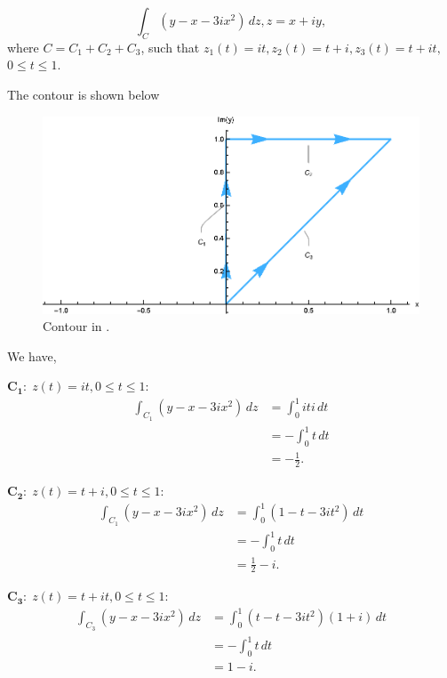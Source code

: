 \documentclass[12pt]{book}
\begin{document}
\begin{exmp}
    \[
        \int_{C} (y - x - 3ix^2)\,dz, z = x + iy,
    \]
where $C = C_1 + C_2 + C_3$, such that $z_{1}(t) = it, z_{2}(t) = t + i, z_{3}(t) = t + it,$ $0 \leq t \leq 1.$
\end{exmp}
The contour is shown below
\begin{figure}[H]
    \centering
    \includegraphics[scale = 0.7]{./figs/chapter_2/ci_contour_ex_1.eps}
    \caption{Contour in .}
\end{figure}

We have,

\noindent $\mathbf{C_1}:\; z(t) = it, 0 \leq t \leq 1:$ \\
\begin{align*}
    \int_{C_1} (y - x - 3ix^2)\,dz
        &=
            \int_{0}^{1} it i\,dt \\
        &=
            -\int_{0}^{1} t\,dt \\
        &=
            -\frac{1}{2}.
\end{align*}

\noindent $\mathbf{C_2}:\; z(t) = t + i, 0 \leq t \leq 1:$ \\
\begin{align*}
    \int_{C_1} (y - x - 3ix^2)\,dz
        &=
            \int_{0}^{1}  (1 - t - 3it^2)\,dt \\
        &=
            -\int_{0}^{1} t\,dt \\
        &=
            \frac{1}{2} - i.
\end{align*}

\noindent $\mathbf{C_3}:\; z(t) = t + it, 0 \leq t \leq 1:$ \\
\begin{align*}
    \int_{C_3} (y - x - 3ix^2)\,dz
        &=
            \int_{0}^{1}  (t - t - 3it^2)(1 + i)\,dt \\
        &=
            -\int_{0}^{1} t\,dt \\
        &=
            1 - i.
\end{align*}
\end{document}
